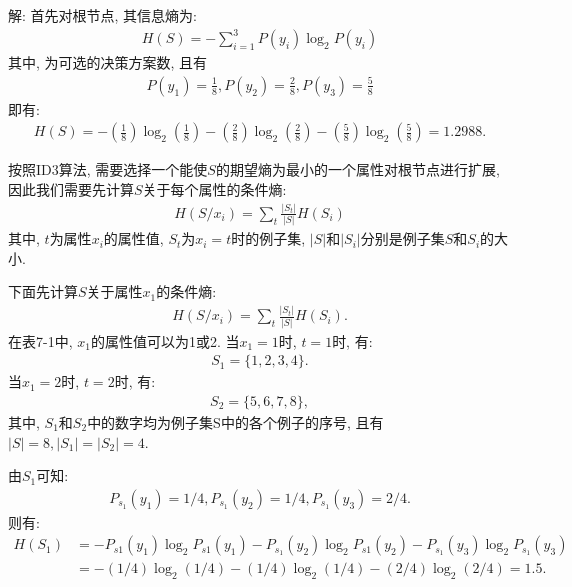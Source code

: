 解:  首先对根节点, 其信息熵为:
\begin{align}
  H(S)=-\sum_{i=1}^{3} P\left(y_{i}\right) \log_ {2} P\left(y_{i}\right)
\end{align}
其中, 为可选的决策方案数, 且有
\begin{align}
  P(y_1)=\frac 1 8, P(y_2)=\frac 2 8, P(y_3)=\frac 5 8
\end{align}
即有:
\begin{align}
    H(S)= -\left(\frac 1 8\right)\log_2 \left(\frac 1 8\right)- \left(\frac 2 8\right)\log_ 2\left(\frac 2 8 \right)- \left(\frac 5 8\right)\log_ 2\left(\frac 5 8\right) =1.2988.
\end{align}

按照ID3算法, 需要选择一个能使$S$的期望熵为最小的一个属性对根节点进行扩展, 因此我们需要先计算$S$关于每个属性的条件熵:
\begin{align}
  H\left(S / x_{i}\right)=\sum_{t} \frac{\left|S_{t}\right|}{|S|} H\left(S_{i}\right)
\end{align}
其中, $t$为属性$x_i$的属性值, $S_t$为$x_i=t$时的例子集, $|S|$和$|S_i|$分别是例子集$S$和$S_i$的大小.

下面先计算$S$关于属性$x_1$的条件熵:
\begin{align}
  H\left(S / x_{i}\right)=\sum_{t} \frac{\left|S_{t}\right|}{|S|} H\left(S_{i}\right).
\end{align}
在表7-1中, $x_1$的属性值可以为1或2. 当$x_1=1$时, $t=1$时, 有:
\begin{align}
  S_1=\{1, 2, 3, 4\}.
\end{align}
当$x_1=2$时, $t=2$时, 有:
\begin{align}
  S_2=\{5, 6, 7, 8\},
\end{align}
其中, $S_1$和$S_2$中的数字均为例子集S中的各个例子的序号, 且有$|S|=8,|S_1|=|S_2|=4$.

由$S_1$可知:
\begin{align}
    P_{s_1}(y_1)=1/4,     P_{s_1}(y_2)=1/4,     P_{s_1}(y_3)=2/4.
\end{align}
则有:
\begin{align}
H(S_1)&= - P_{s1}(y_1)\log_2 P_{s1}(y_1) - P_{s_1}(y_2)\log_2 P_{s1}(y_2 )- P_{s_1}(y_3)\log_2 P_{s_1}(y_3 )\\
     &= -(1/4)\log_2(1/4)- (1/4)\log_2(1/4)- (2/4)\log_2(2/4) =1.5.
\end{align}

